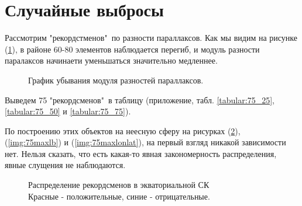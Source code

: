 \documentclass[14pt]{article} %
\begin{document}
\section{Случайные выбросы}\label{sub:smthrs}

Рассмотрим "рекордстменов"\ по разности параллаксов.
Как мы видим на рисунке (\ref{img:abs_paralax}), в районе 60-80 элементов наблюдается перегиб, и модуль разности паралаксов начинаети уменьшаться значительно медленнее.

\begin{figure}[h!]
\caption{График убывания модуля разностей параллаксов.}
\label{img:abs_paralax}
\end{figure}

Выведем 75 "рекордсменов"\ в таблицу (приложение, табл. \ref{tabular:75_25}, \ref{tabular:75_50} и \ref{tabular:75_75}).

По построению этих объектов на неесную сферу на рисурках (\ref{img:75maxradec}), (\ref{img:75maxlb}) и (\ref{img:75maxlonlat}), на первый взгляд никакой зависимости нет. Нельзя сказать, что есть какая-то явная  закономерность распределения, явные слущения не наблюдаются.

\begin{figure}[h!]
\caption{Распределение рекордсменов в экваториальной СК\\Красные - положительные, синие - отрицательные.}
\label{img:75maxradec}
\end{figure}
\end{document}
